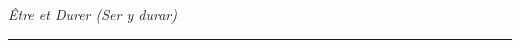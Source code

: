 \chapter*{} %

\begin{flushright}
    \textit{Être et Durer (Ser y durar)} \\
    \rule{5cm}{0.5pt} 
\end{flushright}

